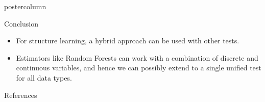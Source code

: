 \documentclass{beamer}
\begin{document}
\begin{frame}
\begin{columns}
\begin{column}{0.33\textwidth}
\begin{beamercolorbox}[center]{postercolumn}
\begin{minipage}{.98\textwidth}
{\begin{myblock}{Conclusion}
\begin{itemize}
			\item \justifying For structure learning, a hybrid approach can be
				used with other tests.
			\item  \justifying Estimators like Random Forests can work with a
				combination of discrete and continuous
				variables, and hence we can possibly extend to
				a single unified test for all data types.
		\end{itemize}
	\end{myblock}\vfill
	\begin{myblock}{References}
		\footnotesize
		
		
	\end{myblock}\vfill
		}\end{minipage}\end{beamercolorbox}
	\end{column}
\end{columns}
\end{frame}
\end{document}
